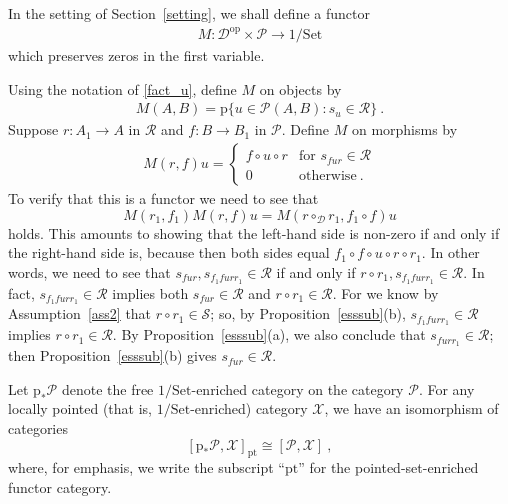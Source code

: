 \documentclass[a4paper,12pt,reqno]{amsart}
\theoremstyle{definition}
\theoremstyle{fact}
\theoremstyle{genquest}
\theoremstyle{step}
\newcommand{\dd}{\colon}
\newcommand{\lra}{\longrightarrow}
\newcommand{\ra}{\rightarrow}
\def\CD{{\mathscr D}}
\def\CP{{\mathscr P}}
\def\CR{{\mathscr R}}
\def\CS{{\mathscr S}}
\def\CX{{\mathscr X}}
\begin{document}
In the setting of Section~\ref{setting}, we shall define a functor
\begin{eqnarray}\label{moduleM}
M\dd \CD^{\mathrm{op}}\times \CP \lra 1/\mathrm{Set}
\end{eqnarray}
which preserves zeros in the first variable.

Using the notation of \eqref{fact_u}, define $M$ on objects by
\begin{eqnarray}\label{Mobj}
M(A,B) = \mathrm{p}\{u\in \CP(A,B) \dd s_u\in \CR \} \ .
\end{eqnarray}
Suppose $r\dd A_1 \ra A$ in $\CR$ and $f\dd B\ra B_1$ in $\CP$.
Define $M$ on morphisms by
\begin{eqnarray}\label{Mmor}
M(r,f)u = 
\begin{cases}
f\circ u \circ r & \text{for }  s_{fur}\in \CR \\
0 & \text{otherwise} \ .
\end{cases}
\end{eqnarray}
To verify that this is a functor we need to see that 
$$M(r_1,f_1)M(r,f)u = M(r\circ_{\CD} r_1,f_1\circ f)u$$ holds. 
This amounts to showing
that the left-hand side is non-zero if and only if the right-hand side is, 
because then both sides
equal $f_1\circ f\circ u \circ r\circ r_1$. 
In other words, we need to see that 
$s_{fur}, s_{f_1furr_1}\in \CR$ if and only if $r\circ r_1, s_{f_1furr_1}\in \CR$.
In fact, $s_{f_1furr_1}\in \CR$ implies both $s_{fur}\in \CR$ and $r\circ r_1\in \CR$.   
For we know by Assumption~\ref{ass2} that $r\circ r_1 \in \CS$; 
so, by Proposition~\ref{esssub}(b), $s_{f_1furr_1}\in \CR$ implies $r\circ r_1 \in \CR$.
By Proposition~\ref{esssub}(a), we also conclude that $s_{furr_1}\in \CR$;
then Proposition~\ref{esssub}(b) gives $s_{fur}\in \CR$.    

Let $\mathrm{p}_{*}\CP$ denote the free $1/\mathrm{Set}$-enriched category on the category $\CP$. 
For any locally pointed (that is, $1/\mathrm{Set}$-enriched) category $\CX$, we have an isomorphism of categories
$$[\mathrm{p}_{*}\CP,\CX]_{\mathrm{pt}} \cong [\CP,\CX] \ , $$ 
where, for emphasis, we write the subscript ``$\mathrm{pt}$'' 
for the pointed-set-enriched functor category.    
\end{document}
